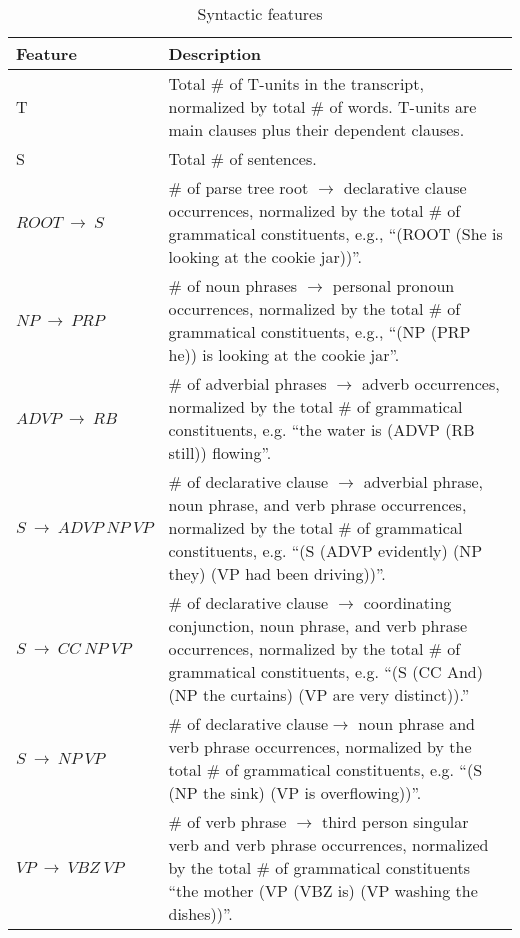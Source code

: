 \documentclass{article}
\begin{document}
\begin{table}[h]
\caption{Syntactic features}
\begin{tabular}{|p{3.5cm}|p{9.5cm}|}
\hline
\textbf{Feature} & \textbf{Description} \\ \hline
T & Total \# of T-units in the transcript, normalized by total \# of words. T-units are main clauses plus their dependent clauses.\\ \hline
S & Total \# of sentences. \\ \hline
$ROOT \ \rightarrow \ S$ & \# of parse tree root $\rightarrow$ declarative clause occurrences, normalized by the total \# of grammatical constituents, e.g., ``(ROOT (She is looking at the cookie jar))''.\\ \hline
$NP \ \rightarrow \ PRP$ & \# of noun phrases $\rightarrow$ personal pronoun  occurrences, normalized by the total \# of grammatical constituents, e.g., ``(NP (PRP he)) is looking at the cookie jar''.\\ \hline
$ADVP \ \rightarrow \ RB$ &  \# of adverbial phrases $\rightarrow$ adverb occurrences, normalized by the total \# of grammatical constituents, e.g. ``the water is (ADVP (RB still)) flowing''.\\ \hline
$S \ \rightarrow \ ADVP \ NP \ VP$ &  \# of declarative clause $\rightarrow$ adverbial phrase, noun phrase, and verb phrase  occurrences, normalized by the total \# of grammatical constituents, e.g. ``(S (ADVP evidently) (NP  they) (VP had been driving))''. \\ \hline
$S \ \rightarrow \ CC \ NP \ VP$ &  \# of declarative clause $\rightarrow$  coordinating conjunction, noun phrase, and verb phrase occurrences, normalized by the total \# of grammatical constituents, e.g. ``(S (CC And) (NP the curtains) (VP  are very distinct)).''\\ \hline
$S \ \rightarrow \ NP \ VP$ &  \# of declarative clause$\rightarrow$ noun phrase and verb phrase  occurrences, normalized by the total \# of grammatical constituents, e.g. ``(S (NP the sink) (VP is overflowing))''. \\ \hline
$VP \ \rightarrow \ VBZ \ VP$ &  \# of verb phrase $\rightarrow$ third person singular verb and verb phrase  occurrences, normalized by the total \# of grammatical constituents ``the mother (VP (VBZ is) (VP washing the dishes))''. \\ \hline

\end{tabular}
\end{table}
\end{document}
